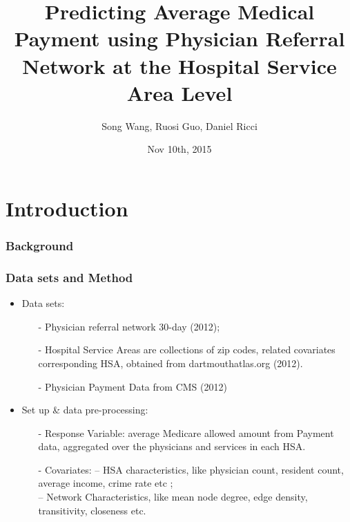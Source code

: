 \documentclass{beamer}
\title[Stat 992 ]{Predicting Average Medical Payment using Physician Referral Network at the Hospital Service Area Level}
\author{Song Wang, Ruosi Guo, Daniel Ricci 
 }
\date{Nov 10th, 2015}
\begin{document}
\begin{frame}
\titlepage
\end{frame}
\section{Introduction}
\begin{frame}
\frametitle{Background}

\end{frame}

\begin{frame}
\frametitle{Data sets and Method}
\begin{itemize}
\item Data sets:
\begin{itemize}
\item[-]  Physician referral network 30-day  (2012); 
\item[-]  Hospital Service Areas are collections of zip codes, related covariates corresponding HSA, obtained from dartmouthatlas.org (2012).
\item[-]  Physician Payment Data from CMS (2012)
\end{itemize}
\item Set up \& data pre-processing:
\begin{itemize}
 \item[-] Response Variable:
 average Medicare allowed amount from Payment data, aggregated over the physicians and services in each HSA.
 \item[-] Covariates: -- HSA characteristics, like physician count, resident count, average income, crime rate etc ;\\
    -- Network Characteristics, like mean node degree, edge density, transitivity, closeness etc.
 \end{itemize}
          
\end{itemize}
\end{frame}
\end{document}
